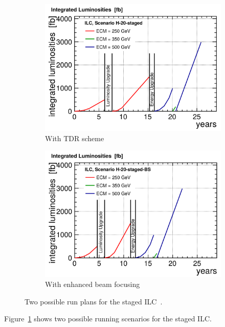 \begin{figure}
\centering
\begin{subfigure}[t]{0.49\textwidth}
 \centering
 \includegraphics[width=\textwidth]{Figures/ILC_runningtime_1.png}
 \caption{With TDR scheme}
\end{subfigure}
\hfill
\begin{subfigure}[t]{0.49\textwidth}
 \centering
 \includegraphics[width=\textwidth]{Figures/ILC_runningtime_2.png}
 \caption{With enhanced beam focusing}
\end{subfigure}
\caption[ILC staging run plans]{Two possible run plans for the staged ILC~\cite[p. 8]{PhysicsCase}.}
\label{fig:ILC_runningtime}
\end{figure}
Figure~\ref{fig:ILC_runningtime} shows two possible running scenarios for the staged ILC.
